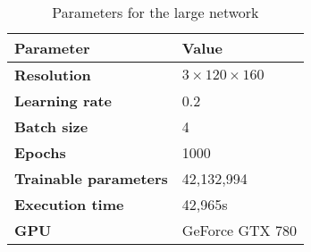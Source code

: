 \begin{table}[h!]
	\footnotesize
	\centering
	\begin{tabular}{ll}
	\hline
		\textbf{Parameter} & \textbf{Value}\\
	\hline
	\hline
		\textbf{Resolution} & $3 \times 120\times160$\\
		\textbf{Learning rate} & 0.2\\
		\textbf{Batch size} & 4\\
		\textbf{Epochs} & 1000\\
		\textbf{Trainable parameters} & 42,132,994\\
		\textbf{Execution time} & 42,965s\\
		\textbf{GPU} & GeForce GTX 780\\
	\hline
	\end{tabular}
	\caption{Parameters for the large network}
	\label{tab:cnn_params_largenet}
\end{table}
